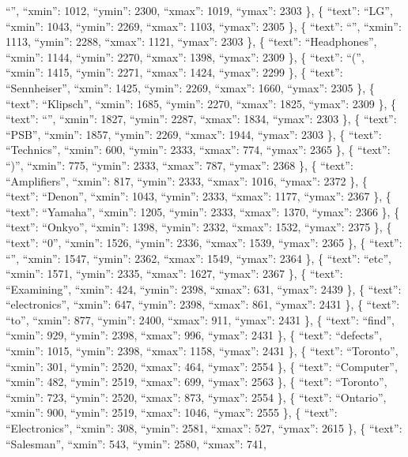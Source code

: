 \documentclass[
]{article}
\begin{document}
``\textbar{}'', ``xmin'': 1012, ``ymin'': 2300, ``xmax'': 1019,
``ymax'': 2303 \}, \{ ``text'': ``LG'', ``xmin'': 1043, ``ymin'': 2269,
``xmax'': 1103, ``ymax'': 2305 \}, \{ ``text'': ``\textbar{}'',
``xmin'': 1113, ``ymin'': 2288, ``xmax'': 1121, ``ymax'': 2303 \}, \{
``text'': ``Headphones'', ``xmin'': 1144, ``ymin'': 2270, ``xmax'':
1398, ``ymax'': 2309 \}, \{ ``text'': ``('', ``xmin'': 1415, ``ymin'':
2271, ``xmax'': 1424, ``ymax'': 2299 \}, \{ ``text'': ``Sennheiser'',
``xmin'': 1425, ``ymin'': 2269, ``xmax'': 1660, ``ymax'': 2305 \}, \{
``text'': ``Klipsch'', ``xmin'': 1685, ``ymin'': 2270, ``xmax'': 1825,
``ymax'': 2309 \}, \{ ``text'': ``\textbar{}'', ``xmin'': 1827,
``ymin'': 2287, ``xmax'': 1834, ``ymax'': 2303 \}, \{ ``text'': ``PSB'',
``xmin'': 1857, ``ymin'': 2269, ``xmax'': 1944, ``ymax'': 2303 \}, \{
``text'': ``Technics'', ``xmin'': 600, ``ymin'': 2333, ``xmax'': 774,
``ymax'': 2365 \}, \{ ``text'': ``)'', ``xmin'': 775, ``ymin'': 2333,
``xmax'': 787, ``ymax'': 2368 \}, \{ ``text'': ``Amplifiers'', ``xmin'':
817, ``ymin'': 2333, ``xmax'': 1016, ``ymax'': 2372 \}, \{ ``text'':
``Denon'', ``xmin'': 1043, ``ymin'': 2333, ``xmax'': 1177, ``ymax'':
2367 \}, \{ ``text'': ``Yamaha'', ``xmin'': 1205, ``ymin'': 2333,
``xmax'': 1370, ``ymax'': 2366 \}, \{ ``text'': ``Onkyo'', ``xmin'':
1398, ``ymin'': 2332, ``xmax'': 1532, ``ymax'': 2375 \}, \{ ``text'':
``0'', ``xmin'': 1526, ``ymin'': 2336, ``xmax'': 1539, ``ymax'': 2365
\}, \{ ``text'': ``\textbar{}'', ``xmin'': 1547, ``ymin'': 2362,
``xmax'': 1549, ``ymax'': 2364 \}, \{ ``text'': ``etc'', ``xmin'': 1571,
``ymin'': 2335, ``xmax'': 1627, ``ymax'': 2367 \}, \{ ``text'':
``Examining'', ``xmin'': 424, ``ymin'': 2398, ``xmax'': 631, ``ymax'':
2439 \}, \{ ``text'': ``electronics'', ``xmin'': 647, ``ymin'': 2398,
``xmax'': 861, ``ymax'': 2431 \}, \{ ``text'': ``to'', ``xmin'': 877,
``ymin'': 2400, ``xmax'': 911, ``ymax'': 2431 \}, \{ ``text'': ``find'',
``xmin'': 929, ``ymin'': 2398, ``xmax'': 996, ``ymax'': 2431 \}, \{
``text'': ``defects'', ``xmin'': 1015, ``ymin'': 2398, ``xmax'': 1158,
``ymax'': 2431 \}, \{ ``text'': ``Toronto'', ``xmin'': 301, ``ymin'':
2520, ``xmax'': 464, ``ymax'': 2554 \}, \{ ``text'': ``Computer'',
``xmin'': 482, ``ymin'': 2519, ``xmax'': 699, ``ymax'': 2563 \}, \{
``text'': ``Toronto'', ``xmin'': 723, ``ymin'': 2520, ``xmax'': 873,
``ymax'': 2554 \}, \{ ``text'': ``Ontario'', ``xmin'': 900, ``ymin'':
2519, ``xmax'': 1046, ``ymax'': 2555 \}, \{ ``text'': ``Electronics'',
``xmin'': 308, ``ymin'': 2581, ``xmax'': 527, ``ymax'': 2615 \}, \{
``text'': ``Salesman'', ``xmin'': 543, ``ymin'': 2580, ``xmax'': 741,
\end{document}
